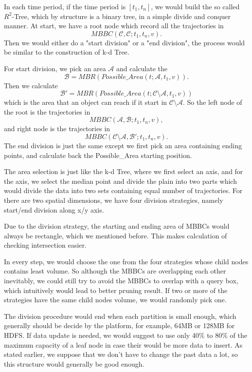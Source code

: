 \documentclass[sigplan]{acmart}
\begin{document}
In each time period, if the time period is $[t_1,t_n]$, we would build the so called $R^2$-Tree, which by structure is a binary tree, in a simple divide and conquer manner. At start, we have a root node which record all the trajectories in $$MBBC(\mathcal{C},\mathcal{C};t_1,t_n,v).$$ Then we would either do a "start division" or a "end division", the process would be similar to the construction of k-d Tree.\par

For start division, we pick an area $\mathcal{A}$ and calculate the $$\mathcal{B}=MBR(Possible\_Area(t;\mathcal{A},t_1,v)).$$
Then we calculate $$\mathcal{B'}=MBR(Possible\_Area(t;\mathcal{C} \setminus \mathcal{A},t_1,v))$$
which is the area that an object can reach if it start in $\mathcal{C}\setminus \mathcal{A}$. So the left node of the root is the trajectories in $$MBBC(\mathcal{A},\mathcal{B};t_1,t_n,v),$$ and right node is the trajectories in $$MBBC(\mathcal{C}\setminus \mathcal{A},\mathcal{B'};t_1,t_n,v).$$ The end division is just the same except we first pick an area containing ending points, and calculate back the Possible\_Area starting position.\par

The area selection is just like the k-d Tree, where we first select an axis, and for the axis, we select the median point and divide the plain into two parts which would divide the data into two sets containing equal number of trajectories. For there are two spatial dimensions, we have four division strategies, namely start/end division along x/y axis.\par

Due to the division strategy, the starting and ending area of MBBCs would always be rectangle, which we mentioned before. This makes calculation of checking intersection easier.

In every step, we would choose the one from the four strategies whose child nodes contains least volume. So although the MBBCs are overlapping each other inevitably, we could still try to avoid the MBBCs to overlap with a query box, which intuitively would lead to better pruning result. If two or more of the strategies have the same child nodes volume, we would randomly pick one.\par
The division procedure would end when each partition is small enough, which generally should be decide by the platform, for example, 64MB or 128MB for HDFS. If data update is needed, we would suggest to use only 40\% to 80\% of the maximum capacity of a leaf node in case their would be more data to insert. As stated earlier, we suppose that we don't have to change the past data a lot, so this structure would generally be good enough. \par
\end{document}
